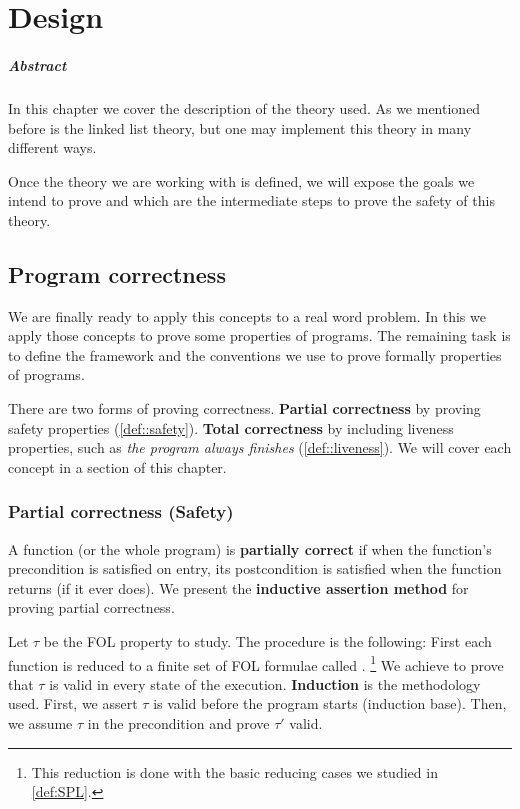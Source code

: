 \chapter{Design\label{chap:design}}

\paragraph{Abstract} In this chapter we cover the description of the theory used. As we mentioned before is the linked list theory, but one may implement this theory in many different ways. 

Once the theory we are working with is defined, we will expose the goals we intend to prove and which are the intermediate steps to prove the safety of this theory.


\section{Program correctness}


We are finally ready to apply this concepts to a real word problem. In this \thisworkm we apply those concepts to prove some properties of programs.
%
The remaining task is to define the framework and the conventions we use to prove formally properties of programs.

There are two forms of proving correctness. 
%
\textbf{Partial correctness} by proving safety properties (\ref{def::safety}).
%
\textbf{Total correctness} by including liveness properties, such as \textit{the program always finishes} (\ref{def::liveness}). 
%
We will cover each concept in a section of this chapter.



\label{def:SPL}



\subsection{Partial correctness (Safety)}

A function (or the whole program) is \textbf{partially correct} if when the function's precondition is satisfied on entry, its postcondition is satisfied when the function returns (if it ever does).
%
We present the \textbf{inductive assertion method} for proving partial correctness.


Let $\tau$ be the \gls{FOL} property to study. 
%
The procedure is the following:
%
First each function is reduced to a finite set of \gls{FOL} formulae called .
%
\footnote{This reduction is done with the basic reducing cases we studied in \ref{def:SPL}.}
%
We achieve to prove that $\tau$ is valid in every state of the execution.
%
\textbf{Induction} is the methodology used.
%
First, we assert $\tau$ is valid before the program starts (induction base).
%
Then, we assume $\tau$ in the precondition and prove $\tau'$ valid.



